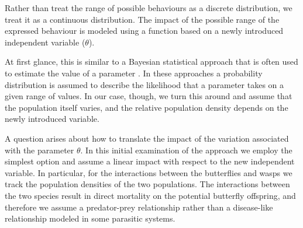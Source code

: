 \documentclass[review,authoryear]{elsarticle}
\begin{document}
Rather than treat the range of possible behaviours as a discrete distribution, 
we treat it as a continuous distribution. The impact of the possible range of the expressed behaviour is modeled using a function based on a newly introduced independent variable ($\theta$).

At first glance, this is similar to a Bayesian statistical approach that
is often used to estimate the value of a
parameter \citep{doi:10.1111/j.1467-9868.2007.00610.x,Fitzpatrick_1991}. In
these approaches a probability distribution is assumed to describe the
likelihood that a parameter takes on a given range of values. In our
case, though, we turn this around and assume that the population
itself varies, and the relative population density depends on the newly introduced
variable.

A question arises about how to translate the impact of the variation associated with the parameter $\theta$. In this initial examination of the approach we
employ the simplest option and assume a linear impact with respect to
the new independent variable. In particular, for the interactions
between the butterflies and wasps we track the population densities of
the two populations. The interactions between the two species result
in direct mortality on the potential butterfly offspring, and therefore we assume a
predator-prey relationship rather than a disease-like relationship
modeled in some parasitic systems. 
\end{document}
